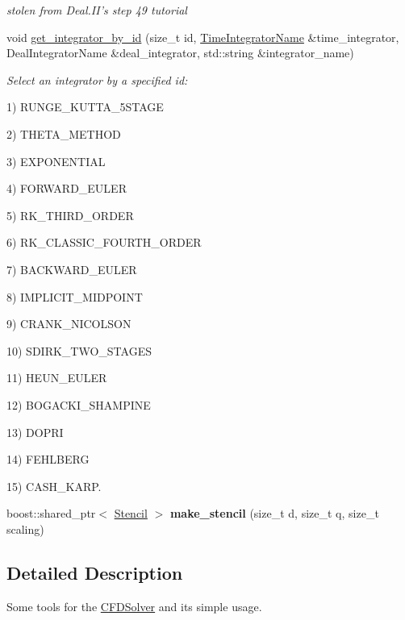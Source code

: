 \begin{DoxyCompactItemize}
\begin{DoxyCompactList}\small\item\em stolen from Deal.II's step 49 tutorial \item\end{DoxyCompactList}\item 
void \hyperlink{namespacenatrium_1_1CFDSolverUtilities_a3719826384e1c13644bac00524f72a46}{get\_\-integrator\_\-by\_\-id} (size\_\-t id, \hyperlink{namespacenatrium_a00a0ec1e80f138680e0fcca78349f6d8}{TimeIntegratorName} \&time\_\-integrator, DealIntegratorName \&deal\_\-integrator, std::string \&integrator\_\-name)
\begin{DoxyCompactList}\small\item\em Select an integrator by a specified id:
\begin{DoxyItemize}
\item 1) RUNGE\_\-KUTTA\_\-5STAGE
\item 2) THETA\_\-METHOD
\item 3) EXPONENTIAL
\item 4) FORWARD\_\-EULER
\item 5) RK\_\-THIRD\_\-ORDER
\item 6) RK\_\-CLASSIC\_\-FOURTH\_\-ORDER
\item 7) BACKWARD\_\-EULER
\item 8) IMPLICIT\_\-MIDPOINT
\item 9) CRANK\_\-NICOLSON
\item 10) SDIRK\_\-TWO\_\-STAGES
\item 11) HEUN\_\-EULER
\item 12) BOGACKI\_\-SHAMPINE
\item 13) DOPRI
\item 14) FEHLBERG
\item 15) CASH\_\-KARP. 
\end{DoxyItemize}\item\end{DoxyCompactList}\item 
\hypertarget{namespacenatrium_1_1CFDSolverUtilities_a6bbf2001ab29fe02fc3a11bcf1515614}{
boost::shared\_\-ptr$<$ \hyperlink{classnatrium_1_1Stencil}{Stencil} $>$ {\bfseries make\_\-stencil} (size\_\-t d, size\_\-t q, size\_\-t scaling)}
\label{namespacenatrium_1_1CFDSolverUtilities_a6bbf2001ab29fe02fc3a11bcf1515614}

\end{DoxyCompactItemize}


\subsection{Detailed Description}
Some tools for the \hyperlink{classnatrium_1_1CFDSolver}{CFDSolver} and its simple usage. 

